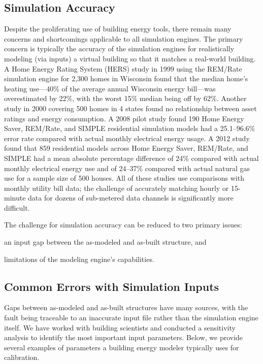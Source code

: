 \documentclass[preprint, review, 12pt]{elsarticle}
\begin{document}
\subsection{Simulation Accuracy}
Despite the proliferating use of building energy tools, there remain many concerns and shortcomings applicable to all simulation engines. The primary concern is typically the accuracy of the simulation engines for realistically modeling (via inputs) a virtual building so that it matches a real-world building. A Home Energy Rating System (HERS) study in 1999 \cite{cit:pigg2001} using the REM/Rate
simulation engine for 2,300 homes in Wisconsin found that the median home's heating use---40\% of the average annual Wisconsin energy bill---was overestimated by 22\%, with the worst 15\% median being off by 62\%. Another study in 2000 \cite{Stein2000339} covering 500 homes in 4 states found no relationship between asset ratings and energy consumption. A 2008 pilot study \cite{cit:earthadvantage2009} found 190 Home Energy Saver, REM/Rate, and SIMPLE residential simulation models had a 25.1--96.6\% error rate compared with actual monthly electrical energy usage. A 2012 study \cite{cit:roberts2012} found that 859 residential models across Home Energy Saver, REM/Rate, and SIMPLE had a mean absolute percentage difference of 24\% compared with actual monthly electrical energy use and of 24--37\% compared with actual natural gas use for a sample size of 500 houses. All of these studies use comparisons with monthly utility bill data; the challenge of accurately matching hourly or 15-minute data for dozens of sub-metered data channels is significantly more difficult.

The challenge for simulation accuracy can be reduced to two primary issues: \begin{inparaenum}[(1)]
\item an input gap between the as-modeled and as-built structure, and 
\item limitations of the modeling engine's capabilities.
\end{inparaenum}

\subsection{Common Errors with Simulation Inputs}
Gaps between as-modeled and as-built structures have many sources, with the fault being traceable to an inaccurate input file rather than the simulation engine itself. We have worked with building scientists and conducted a sensitivity analysis to identify the most important input parameters\cite{cit:ostrouchov14}. Below, we provide several examples of parameters a building energy modeler typically uses for calibration.
\end{document}
